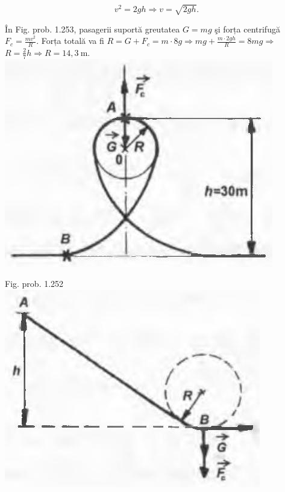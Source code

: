 \documentclass[10pt]{article}
\begin{document}
$$
v^{2}=2 g h \Rightarrow v=\sqrt{2 g h} .
$$

În Fig. prob. 1.253, pasagerii suportă greutatea $G=m g$ şi forța centrifugă $F_{c}=\frac{m v^{2}}{R}$. Forța totală va fi $R=G+F_{c}=m \cdot 8 g \Rightarrow m g+\frac{m \cdot 2 g h}{R}=8 m g \Rightarrow$ $R=\frac{2}{7} h \Rightarrow R=14,3 \mathrm{~m}$.\\
\includegraphics[max width=\textwidth, center]{2025_07_01_5b3ff9fa0d508c8e9f17g-252(1)}

Fig. prob. 1.252\\
\includegraphics[max width=\textwidth, center]{2025_07_01_5b3ff9fa0d508c8e9f17g-252}
\end{document}
